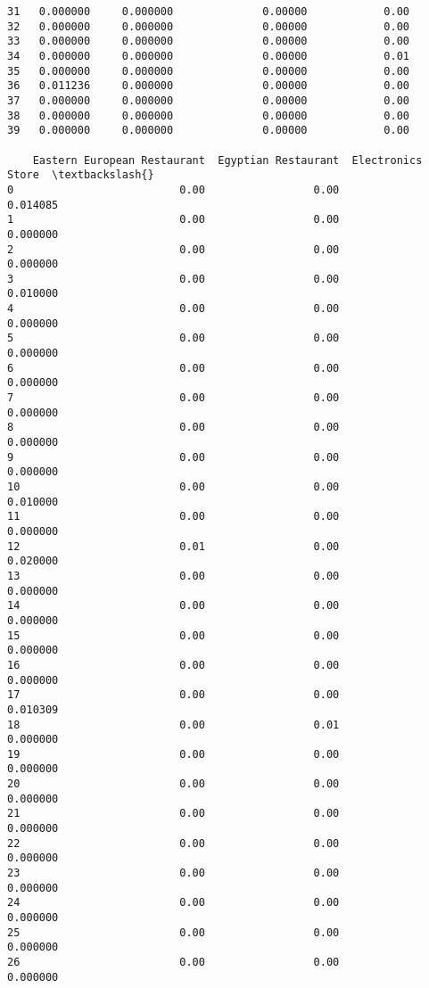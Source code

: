\documentclass[11pt]{article}
\begin{document}
\begin{tcolorbox}[breakable, size=fbox, boxrule=.5pt, pad at break*=1mm, opacityfill=0]
\begin{Verbatim}[commandchars=\\\{\}]
31   0.000000     0.000000              0.00000            0.00
32   0.000000     0.000000              0.00000            0.00
33   0.000000     0.000000              0.00000            0.00
34   0.000000     0.000000              0.00000            0.01
35   0.000000     0.000000              0.00000            0.00
36   0.011236     0.000000              0.00000            0.00
37   0.000000     0.000000              0.00000            0.00
38   0.000000     0.000000              0.00000            0.00
39   0.000000     0.000000              0.00000            0.00

    Eastern European Restaurant  Egyptian Restaurant  Electronics Store  \textbackslash{}
0                          0.00                 0.00           0.014085
1                          0.00                 0.00           0.000000
2                          0.00                 0.00           0.000000
3                          0.00                 0.00           0.010000
4                          0.00                 0.00           0.000000
5                          0.00                 0.00           0.000000
6                          0.00                 0.00           0.000000
7                          0.00                 0.00           0.000000
8                          0.00                 0.00           0.000000
9                          0.00                 0.00           0.000000
10                         0.00                 0.00           0.010000
11                         0.00                 0.00           0.000000
12                         0.01                 0.00           0.020000
13                         0.00                 0.00           0.000000
14                         0.00                 0.00           0.000000
15                         0.00                 0.00           0.000000
16                         0.00                 0.00           0.000000
17                         0.00                 0.00           0.010309
18                         0.00                 0.01           0.000000
19                         0.00                 0.00           0.000000
20                         0.00                 0.00           0.000000
21                         0.00                 0.00           0.000000
22                         0.00                 0.00           0.000000
23                         0.00                 0.00           0.000000
24                         0.00                 0.00           0.000000
25                         0.00                 0.00           0.000000
26                         0.00                 0.00           0.000000

\end{Verbatim}
\end{tcolorbox}
\end{document}
